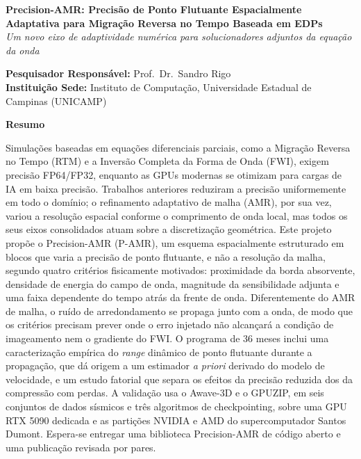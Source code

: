\documentclass[12pt,a4paper]{article}
\newcommand{\pamr}{P\nobreakdash-AMR}
\begin{document}
\thispagestyle{empty}

\begin{center}
{\large\bfseries Precision-AMR: Precisão de Ponto Flutuante Espacialmente
Adaptativa para Migração Reversa no Tempo Baseada em EDPs}\\[0.6em]
{\itshape Um novo eixo de adaptividade numérica para solucionadores
adjuntos da equação da onda}
\end{center}

\vspace{1.5em}

\begin{flushleft}
\textbf{Pesquisador Responsável:} Prof.\ Dr.\ Sandro Rigo\\
\textbf{Instituição Sede:} Instituto de Computação, Universidade Estadual de
Campinas (UNICAMP)
\end{flushleft}

\vspace{1.5em}

\noindent\textbf{Resumo}

\vspace{0.5em}

Simulações baseadas em equações diferenciais parciais, como a Migração
Reversa no Tempo (RTM) e a Inversão Completa da Forma de Onda (FWI), exigem
precisão FP64/FP32, enquanto as GPUs modernas se otimizam para cargas de IA
em baixa precisão. Trabalhos anteriores reduziram a precisão uniformemente
em todo o domínio; o refinamento adaptativo de malha (AMR), por sua vez,
variou a resolução espacial conforme o comprimento de onda local, mas todos
os seus eixos consolidados atuam sobre a discretização geométrica. Este
projeto propõe o Precision-AMR (\pamr{}), um esquema espacialmente
estruturado em blocos que varia a precisão de ponto flutuante, e não a
resolução da malha, segundo quatro critérios fisicamente motivados:
proximidade da borda absorvente, densidade de energia do campo de onda,
magnitude da sensibilidade adjunta e uma faixa dependente do tempo atrás da
frente de onda. Diferentemente do AMR de malha, o ruído de arredondamento se
propaga junto com a onda, de modo que os critérios precisam prever onde o
erro injetado não alcançará a condição de imageamento nem o gradiente do
FWI. O programa de 36 meses inclui uma caracterização empírica do
\emph{range} dinâmico de ponto flutuante durante a propagação, que dá origem
a um estimador \emph{a priori} derivado do modelo de velocidade, e um estudo
fatorial que separa os efeitos da precisão reduzida dos da compressão com
perdas. A validação usa o Awave-3D e o GPUZIP, em seis conjuntos de dados
sísmicos e três algoritmos de checkpointing, sobre uma GPU RTX 5090 dedicada
e as partições NVIDIA e AMD do supercomputador Santos Dumont. Espera-se
entregar uma biblioteca Precision-AMR de código aberto e uma publicação
revisada por pares.
\end{document}
